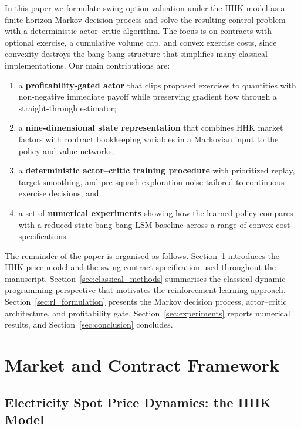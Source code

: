 \documentclass[a4paper,fleqn]{cas-dc}
\begin{document}
In this paper we formulate swing-option valuation under the HHK model as a finite-horizon Markov decision process and solve the resulting control problem with a deterministic actor--critic algorithm. The focus is on contracts with optional exercise, a cumulative volume cap, and convex exercise costs, since convexity destroys the bang-bang structure that simplifies many classical implementations. Our main contributions are:
\begin{enumerate}
    \item a \textbf{profitability-gated actor} that clips proposed exercises to quantities with non-negative immediate payoff while preserving gradient flow through a straight-through estimator;
    \item a \textbf{nine-dimensional state representation} that combines HHK market factors with contract bookkeeping variables in a Markovian input to the policy and value networks;
    \item a \textbf{deterministic actor--critic training procedure} with prioritized replay, target smoothing, and pre-squash exploration noise tailored to continuous exercise decisions; and
    \item a set of \textbf{numerical experiments} showing how the learned policy compares with a reduced-state bang-bang LSM baseline across a range of convex cost specifications.
\end{enumerate}

The remainder of the paper is organised as follows. Section~\ref{sec:market_contract} introduces the HHK price model and the swing-contract specification used throughout the manuscript. Section~\ref{sec:classical_methods} summarises the classical dynamic-programming perspective that motivates the reinforcement-learning approach. Section~\ref{sec:rl_formulation} presents the Markov decision process, actor--critic architecture, and profitability gate. Section~\ref{sec:experiments} reports numerical results, and Section~\ref{sec:conclusion} concludes.

\section{Market and Contract Framework}
\label{sec:market_contract}

\subsection{Electricity Spot Price Dynamics: the HHK Model}
\end{document}
